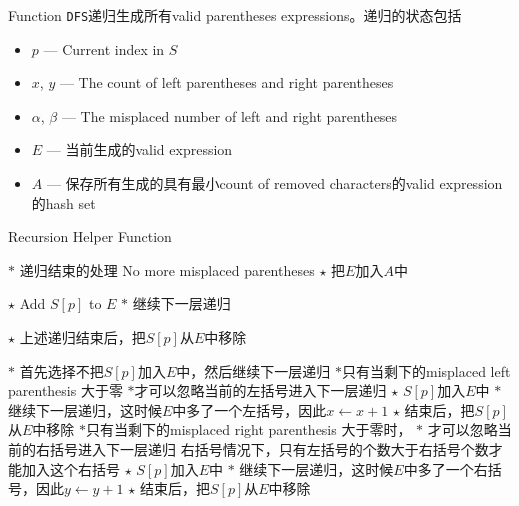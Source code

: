 Function \texttt{DFS}递归生成所有valid parentheses expressions。递归的状态包括
\begin{itemize}
	\item $p$ --- Current index in $S$
	\item $x$, $y$ --- The count of left parentheses and right parentheses
	\item $\alpha$, $\beta$ --- The misplaced number of left and right parentheses
	\item $E$ --- 当前生成的valid expression
	\item $A$ --- 保存所有生成的具有最小count of removed characters的valid expression的hash set
\end{itemize}
\begin{algorithm}[H]
	\caption{Recursion Helper Function}
	\begin{algorithmic}[1]
		\State $\ast$ 递归结束的处理
		 \Comment No more misplaced parentheses
		\State $\star$ 把$E$加入$A$中
		\EndIf
		\State \Return
		\EndIf
		\end{algorithmic}
	\end{algorithm}
\begin{algorithm}[H]
	\begin{algorithmic}[1]
		\State $\star$ Add $S[p]$ to $E$
		\State $\ast$ 继续下一层递归
		
				\State {}
		\State $\star$ 上述递归结束后，把$S[p]$从$E$中移除
		
				\Else
		\State $\ast$ 首先选择不把$S[p]$加入$E$中，然后继续下一层递归
		\State $\ast$只有当剩下的misplaced left parenthesis 大于零
		\State $\ast$才可以忽略当前的左括号进入下一层递归
		\State  {}
		\EndIf
		\State $\star$ $S[p]$加入$E$中
		\State $\ast$ 继续下一层递归，这时候$E$中多了一个左括号，因此$x\gets x+1$
		\State {}
		\State $\star$ 结束后，把$S[p]$从$E$中移除
		\Else
				\State $\ast$只有当剩下的misplaced right parenthesis 大于零时，
				\State $\ast$ 才可以忽略当前的右括号进入下一层递归
				\State  {}
				\EndIf
				 \Comment 右括号情况下，只有左括号的个数大于右括号个数才能加入这个右括号
					\State $\star$ $S[p]$加入$E$中
					\State $\ast$ 继续下一层递归，这时候$E$中多了一个右括号，因此$y\gets y+1$
					\State {}
					\State $\star$ 结束后，把$S[p]$从$E$中移除
				\EndIf	
		\EndIf
		\EndFunction
	\end{algorithmic}
\end{algorithm}
